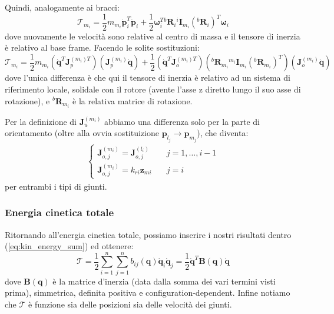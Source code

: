 Quindi, analogamente ai bracci:
$$
\mathcal{T}_{m_i}
=
\frac{1}{2} m_{m_i} \bm{\dot{p}}_i^T \bm{\dot{p}}_i
+
\frac{1}{2} \bm{\omega}_i^T {}^b\bm{R}_i {}^i\bm{I}_{m_i} ({}^b\bm{R}_i)^T \bm{\omega}_i
$$
dove nuovamente le velocità sono relative al centro di massa e il tensore di inerzia è relativo al base frame. Facendo le solite sostituzioni:
$$
\mathcal{T}_{m_i}
=
\frac{1}{2} m_{m_i} \left(\bm{\dot{q}}^T \bm{J}_p^{(m_i)T}\right) \left(\bm{J}_p^{(m_i)} \bm{\dot{q}}\right)
+
\frac{1}{2} 
\left(\bm{\dot{q}}^T \bm{J}_o^{(m_i)T}\right)
\left( {}^b\bm{R}_{m_i} {}^{m_i}\bm{I}_{m_i} ({}^b\bm{R}_{m_i})^T \right)
\left(\bm{J}_o^{(m_i)} \bm{\dot{q}}\right)
$$
dove l'unica differenza è che qui il tensore di inerzia è relativo ad un sistema di riferimento locale, solidale con il rotore (avente l’asse z diretto lungo il suo asse di rotazione), e ${}^b\bm{R}_{m_i}$ è la relativa matrice di rotazione.

Per la definizione di $\bm{J}_u^{(m_i)}$ abbiamo una differenza solo per la parte di orientamento (oltre alla ovvia sostituizione $\bm{p}_{l_j} \rightarrow \bm{p}_{m_j}$), che diventa:
\begin{align*}
	\begin{cases}
		\bm{J}^{(m_i)}_{o,j} = \bm{J}^{(l_i)}_{o,j} & \quad j=1,\dots,i-1 \\
		\bm{J}^{(m_i)}_{o,j} = k_{ri}\bm{z}_{mi} & \quad j=i
	\end{cases}
\end{align*}
per entrambi i tipi di giunti.


\vspace*{5pt}
\subsubsection{Energia cinetica totale}
Ritornando all'energia cinetica totale, possiamo inserire i nostri risultati dentro (\ref{eq:kin_energy_sum}) ed ottenere:
\begin{equation}\label{eq:kin_energy}
\boxed{
\mathcal{T}
= 
\frac{1}{2}
\sum_{i=1}^n
\sum_{j=1}^n
b_{ij}(\bm{q}) \dot{\bm{q}}_i \dot{\bm{q}}_j
=
\frac{1}{2} \dot{\bm{q}}^T \bm{B}(\bm{q}) \dot{\bm{q}}
}
\end{equation}
dove $\bm{B}(\bm{q})$ è la matrice d’inerzia (data dalla somma dei vari termini visti prima), simmetrica, definita positiva e configuration-dependent. Infine notiamo che $\mathcal{T}$ è funzione sia delle posizioni sia delle velocità dei giunti.






